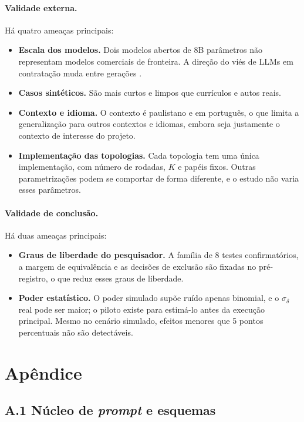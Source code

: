 \documentclass[12pt]{article}
\begin{document}
\paragraph{Validade externa.} Há quatro ameaças principais:
\begin{itemize}
    \item \textbf{Escala dos modelos.} Dois modelos abertos de 8B parâmetros não representam modelos comerciais de fronteira. A direção do viés de LLMs em contratação muda entre gerações \citep{gao2026hiring}.
    \item \textbf{Casos sintéticos.} São mais curtos e limpos que currículos e autos reais.
    \item \textbf{Contexto e idioma.} O contexto é paulistano e em português, o que limita a generalização para outros contextos e idiomas, embora seja justamente o contexto de interesse do projeto.
    \item \textbf{Implementação das topologias.} Cada topologia tem uma única implementação, com número de rodadas, $K$ e papéis fixos. Outras parametrizações podem se comportar de forma diferente, e o estudo não varia esses parâmetros.
\end{itemize}

\paragraph{Validade de conclusão.} Há duas ameaças principais:
\begin{itemize}
    \item \textbf{Graus de liberdade do pesquisador.} A família de 8 testes confirmatórios, a margem de equivalência e as decisões de exclusão são fixadas no pré-registro, o que reduz esses graus de liberdade.
    \item \textbf{Poder estatístico.} O poder simulado supõe ruído apenas binomial, e o $\sigma_\delta$ real pode ser maior; o piloto existe para estimá-lo antes da execução principal. Mesmo no cenário simulado, efeitos menores que 5 pontos percentuais não são detectáveis.
\end{itemize}

\section*{Apêndice}
\label{sec:apendice}

\subsection*{A.1 Núcleo de \textit{prompt} e esquemas}
\end{document}
